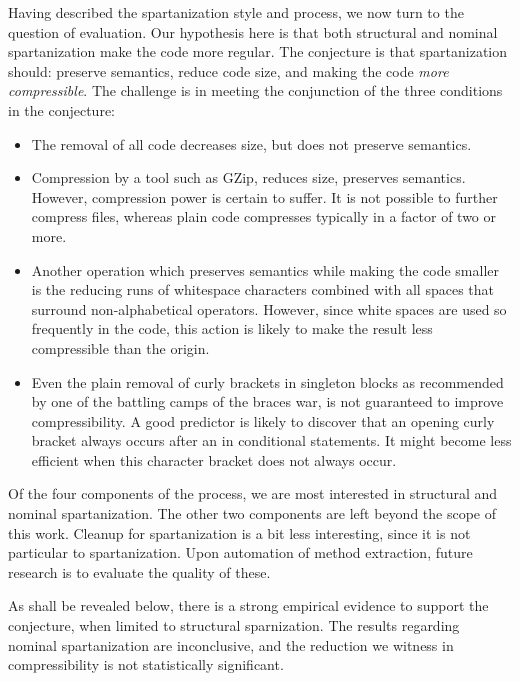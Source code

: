 
Having described the spartanization style and process, we now turn to the
question of evaluation.  Our hypothesis here is that both structural and
nominal spartanization make the code more regular. The conjecture is that
spartanization should: preserve semantics, reduce code size, and making the
code \emph{more compressible}. The challenge is in meeting the conjunction of
the three conditions in the conjecture:
\begin{itemize}
    \item The removal of all code decreases size, but does not preserve semantics.
    \item Compression by a tool such as GZip, reduces size, preserves
      semantics. However, compression power is certain to suffer. It is 
      not possible to further compress  files, whereas plain code
      compresses typically in a factor of two or more.
    \item Another operation which preserves semantics while making
      the code smaller is the reducing runs of whitespace characters combined 
      with all spaces that surround non-alphabetical operators. 
      However, since white spaces are used so frequently in the code,
      this action is likely to make the result less compressible than the origin. 
    \item Even the plain removal of curly brackets in singleton blocks as
      recommended by one of the battling camps of the braces war, is not guaranteed
      to improve compressibility. A good predictor is likely to discover that
      an opening curly bracket always occurs after an  in conditional statements. 
      It might become less efficient when this character bracket does not always occur. 
\end{itemize}

Of the four components of the process, we are most interested in structural and
nominal spartanization. The other two components are left beyond the scope of
this work.  Cleanup for spartanization is a bit less interesting, since it is
not particular to spartanization.  Upon automation of method extraction, future
research is to evaluate the quality of these. 

As shall be revealed below, there is a strong empirical evidence to support
the conjecture, when limited to structural sparnization. The results regarding
nominal spartanization are inconclusive, and the reduction we witness in 
compressibility is not statistically significant. 

